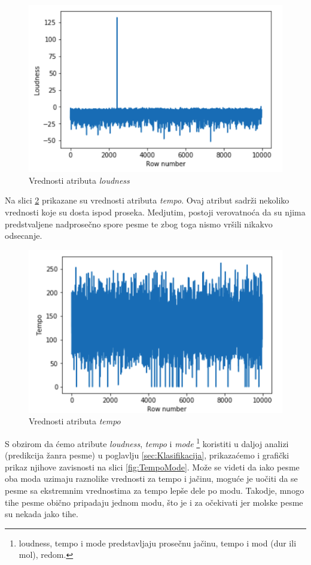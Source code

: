 \begin{figure}[H]
    \includegraphics[scale=0.55]{resources/loudness.png}
    \caption{Vrednosti atributa \emph{loudness}}
    \label{fig:loudness}
\end{figure}

Na slici \ref{fig:tempo} prikazane su vrednosti atributa \emph{tempo}. Ovaj atribut sadr\v{z}i nekoliko vrednosti koje su dosta ispod proseka. Medjutim, postoji verovatno\'c{}a da su njima predstvaljene nadprose\v{c}no spore pesme te zbog toga nismo vr\v{s}ili nikakvo odsecanje.

\begin{figure}[H]
    \includegraphics[scale=0.6]{resources/tempo.png}
    \caption{Vrednosti atributa \emph{tempo}}
    \label{fig:tempo}
\end{figure}

S obzirom da \'c{}emo atribute \emph{loudness}, \emph{tempo} i \emph{mode} \footnote{loudness, tempo i mode predstavljaju prose\v{c}nu ja\v{c}inu, tempo i mod (dur ili mol), redom.} koristiti u daljoj analizi (predikcija \v{z}anra pesme) u poglavlju \ref{sec:Klasifikacija}, prikaza\'c{}emo i grafi\v{c}ki prikaz njihove zavisnosti na slici \ref{fig:TempoMode}. Mo\v{z}e se videti da iako pesme oba moda uzimaju raznolike vrednosti za tempo i ja\v{c}inu, mogu\'c{}e je uo\v{c}iti da se pesme sa ekstremnim vrednostima za tempo lep\v{s}e dele po modu. Takodje, mnogo tihe pesme obi\v{c}no pripadaju jednom modu, \v{s}to je i za o\v{c}ekivati jer molske pesme su nekada jako tihe.

